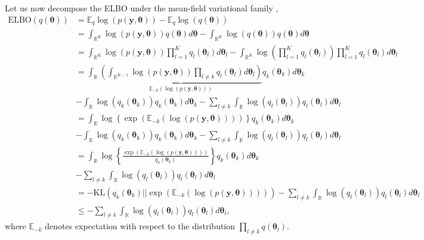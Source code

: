 Let us now decompose the ELBO under the mean-field variational family \cite{nguyen2023depth},
\begin{align*}
		\text{ELBO}(q(\boldsymbol{\theta}))&=\mathbb{E}_q\log(p(\boldsymbol{y}, \boldsymbol{\theta}))-\mathbb{E}_q\log(q(\boldsymbol{\theta}))\\
	&=\int_{\mathbb{R}^K} \log(p(\boldsymbol{y}, \boldsymbol{\theta}))q(\boldsymbol{\theta})d\boldsymbol{\theta}-\int_{\mathbb{R}^K}\log(q(\boldsymbol{\theta}))q(\boldsymbol{\theta})d\boldsymbol{\theta}\\
	&=\int_{\mathbb{R}^K} \log\left(p(\boldsymbol{y}, \boldsymbol{\theta})\right)\prod_{l=1}^K q_l(\boldsymbol{\theta}_l)d\boldsymbol{\theta}_l-\int_{\mathbb{R}^K}\log\left(\prod_{l=1}^K q_l(\boldsymbol{\theta}_l)\right)\prod_{l=1}^K q_l(\boldsymbol{\theta}_l)d\boldsymbol{\theta}_l\\
	&=\int_{\mathbb{R}} \underbrace{\left(\int_{\mathbb{R}^{K-1}}\log\left(p(\boldsymbol{y}, \boldsymbol{\theta})\right)\prod_{l\neq k} q_l(\boldsymbol{\theta}_l)d\boldsymbol{\theta}_l\right)}_{\mathbb{E}_{-k}(\log\left(p(\boldsymbol{y}, \boldsymbol{\theta})\right))}q_k(\boldsymbol{\theta}_k)d\boldsymbol{\theta}_k\\ 
	&-\int_{\mathbb{R}}\log(q_k(\boldsymbol{\theta}_k))q_k(\boldsymbol{\theta}_k)d\boldsymbol{\theta}_k-\sum_{l\neq k}\int_{\mathbb{R}}\log(q_l(\boldsymbol{\theta}_l))q_l(\boldsymbol{\theta}_l)d\boldsymbol{\theta}_l\\
	&=\int_{\mathbb{R}}\log\left\{\exp\left(\mathbb{E}_{-k}(\log\left(p(\boldsymbol{y}, \boldsymbol{\theta})\right))\right)\right\}q_k(\boldsymbol{\theta}_k)d\boldsymbol{\theta}_k\\ 
	&-\int_{\mathbb{R}}\log(q_k(\boldsymbol{\theta}_k))q_k(\boldsymbol{\theta}_k)d\boldsymbol{\theta}_k-\sum_{l\neq k}\int_{\mathbb{R}}\log(q_l(\boldsymbol{\theta}_l))q_l(\boldsymbol{\theta}_l)d\boldsymbol{\theta}_l\\
	&=\int_{\mathbb{R}}\log\left\{\frac{\exp\left(\mathbb{E}_{-k}(\log\left(p(\boldsymbol{y}, \boldsymbol{\theta})\right))\right)}{q_k(\boldsymbol{\theta}_k)}\right\}q_k(\boldsymbol{\theta}_k)d\boldsymbol{\theta}_k\\
	&-\sum_{l\neq k}\int_{\mathbb{R}}\log(q_l(\boldsymbol{\theta}_l))q_l(\boldsymbol{\theta}_l)d\boldsymbol{\theta}_l\\ 
	&=-\text{KL}(q_k(\boldsymbol{\theta}_k)||\exp\left(\mathbb{E}_{-k}(\log\left(p(\boldsymbol{y}, \boldsymbol{\theta})\right))\right))-\sum_{l\neq k}\int_{\mathbb{R}}\log(q_l(\boldsymbol{\theta}_l))q_l(\boldsymbol{\theta}_l)d\boldsymbol{\theta}_l\\
	&\leq -\sum_{l\neq k}\int_{\mathbb{R}}\log(q_l(\boldsymbol{\theta}_l))q_l(\boldsymbol{\theta}_l)d\boldsymbol{\theta}_l,
\end{align*} 
where $\mathbb{E}_{-k}$ denotes expectation with respect to the distribution $\prod_{l\neq k}q(\boldsymbol{\theta}_l)$.

